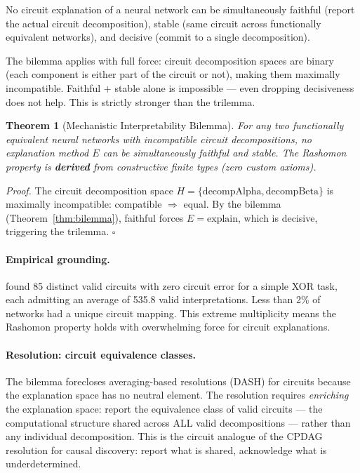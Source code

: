 \documentclass{article}
\newtheorem{theorem}{Theorem}
\begin{document}
No circuit explanation of a neural network can be simultaneously faithful (report the actual circuit decomposition), stable (same circuit across functionally equivalent networks), and decisive (commit to a single decomposition).

The bilemma applies with full force: circuit decomposition spaces are binary (each component is either part of the circuit or not), making them maximally incompatible. Faithful + stable alone is impossible --- even dropping decisiveness does not help. This is strictly stronger than the trilemma.

\begin{theorem}[Mechanistic Interpretability Bilemma]\label{thm:mech-interp-bilemma}
For any two functionally equivalent neural networks with incompatible circuit decompositions, no explanation method $E$ can be simultaneously faithful and stable. The Rashomon property is \textbf{derived} from constructive finite types (zero custom axioms).
\end{theorem}

\noindent\textit{Proof.}
The circuit decomposition space $H = \{\text{decompAlpha}, \text{decompBeta}\}$ is maximally incompatible: compatible $\Rightarrow$ equal. By the bilemma (Theorem~\ref{thm:bilemma}), faithful forces $E = \text{explain}$, which is decisive, triggering the trilemma. \hfill$\square$

\paragraph{Empirical grounding.}
\citet{meloux2025circuits} found 85 distinct valid circuits with zero circuit error for a simple XOR task, each admitting an average of 535.8 valid interpretations. Less than 2\% of networks had a unique circuit mapping. This extreme multiplicity means the Rashomon property holds with overwhelming force for circuit explanations.

\paragraph{Resolution: circuit equivalence classes.}
The bilemma forecloses averaging-based resolutions (DASH) for circuits because the explanation space has no neutral element. The resolution requires \emph{enriching} the explanation space: report the equivalence class of valid circuits --- the computational structure shared across ALL valid decompositions --- rather than any individual decomposition. This is the circuit analogue of the CPDAG resolution for causal discovery: report what is shared, acknowledge what is underdetermined.
\end{document}
